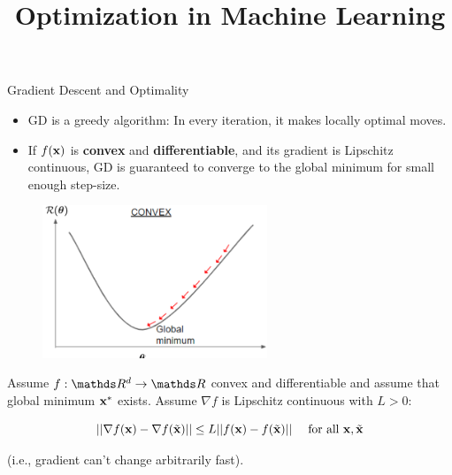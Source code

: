 \documentclass[11pt,compress,t,notes=noshow, xcolor=table]{beamer}
\title{Optimization in Machine Learning}
\date{}
\begin{document}
\sloppy
	
	\begin{vbframe}{Gradient Descent and Optimality}
	
	\begin{itemize}
		\item GD is a greedy algorithm: In every iteration, it makes locally optimal moves.
		\vspace*{0.5mm}
		\item If $f(\mathbf{x})$ is \textbf{convex} and \textbf{differentiable}, and its gradient is Lipschitz continuous, GD is guaranteed to converge to the global minimum for small enough step-size.  
	\end{itemize}
	
	\begin{figure}
		\centering
		\includegraphics[width=0.6\textwidth]{figure_man/gdes_1.png}
	\end{figure}



\framebreak
	
	Assume $f: \R^d \rightarrow \R$ convex and differentiable and assume that global minimum $\mathbf{x}^\ast$ exists. Assume $\nabla f$ is Lipschitz continuous with $L > 0$: 

	\begin{equation*}
	   || \nabla f(\mathbf{x}) - \nabla f(\tilde{\mathbf{x}}) || \le L ||f(\mathbf{x}) - f(\tilde{\mathbf{x}}) || \quad \text{ for all } \mathbf{x}, \tilde{\mathbf{x}}
	\end{equation*}
	
	(i.e., gradient can't change arbitrarily fast).
		

\end{vbframe}
\end{document}
